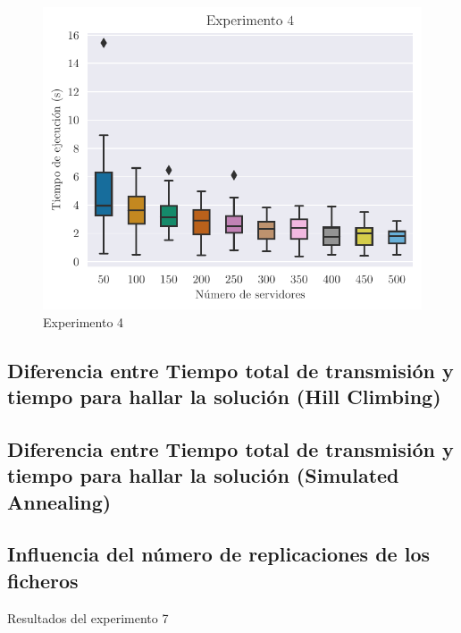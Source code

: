 \begin{figure}[H]
    \centering
    \includegraphics{include/plots/ex4_s_time_bplot_cut.pdf}
    \caption{Experimento 4}%
    \label{fig:ex4s}
\end{figure}

\subsection{Diferencia entre Tiempo total de transmisión y tiempo para hallar la solución (Hill Climbing)}

\subsection{Diferencia entre Tiempo total de transmisión y tiempo para hallar la solución (Simulated Annealing)}

\subsection{Influencia del número de replicaciones de los ficheros}

\begin{table}[H]
    \centering
    \caption{Resultados del experimento 7}%
    \label{tab:ex7}
    \begin{center}
    
    \end{center}
\end{table}

